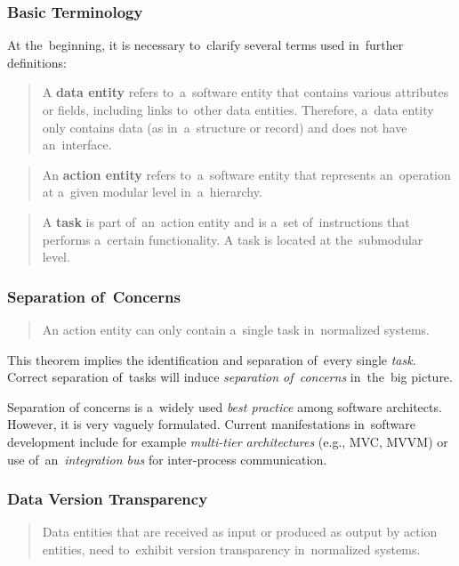 \documentclass[thesis=M,english,hidelinks]{FITthesis}[2012/10/20]
\begin{document}
\subsubsection*{Basic Terminology}
At the~beginning, it is necessary to~clarify several terms used in~further definitions:
\begin{quote}
A \textbf{data entity} refers to~a~software entity that contains various attributes or fields, including links to~other data entities. Therefore, a~data entity only contains data (as in~a~structure or record) and does not have an~interface.~\cite{ns-recreating}
\end{quote}

\begin{quote}
An \textbf{action entity} refers to~a~software entity that represents an~operation at a~given modular level in~a~hierarchy.~\cite{ns-recreating}
\end{quote}

\begin{quote}
A \textbf{task} is part of~an~action entity and is a~set of~instructions that performs a~certain functionality. A task is located at the~submodular level.~\cite{ns-recreating}
\end{quote}

\subsubsection{Separation of~Concerns}
\begin{quote}
An action entity can only contain a~single task in~normalized systems.~\cite{ns-recreating}
\end{quote}

This theorem implies the identification and separation of~every single \textit{task}. Correct separation of~tasks will induce \emph{separation of~concerns} in~the~big picture.

Separation of concerns is a~widely used \emph{best practice} among software architects. However, it is very vaguely formulated. Current manifestations in~software development include for example \emph{multi-tier architectures} (e.g., \acrshort{MVC}, \acrshort{MVVM}) or use of~an~\emph{integration bus} for inter-process communication.

\subsubsection{Data Version Transparency}
\begin{quote}
Data entities that are received as input or produced as output by action entities, need to~exhibit version transparency in~normalized systems.~\cite{ns-recreating}
\end{quote}
\end{document}
